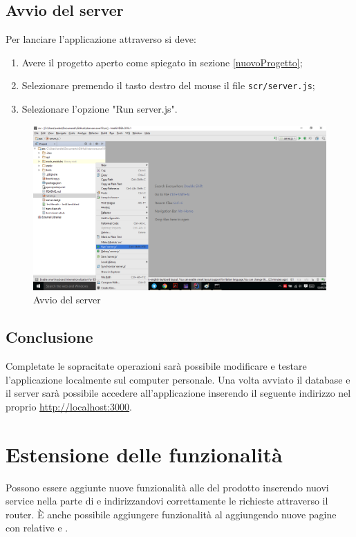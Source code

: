 \documentclass[12pt,a4paper]{article}
\begin{document}
	\subsection{Avvio del server}
	Per lanciare l'applicazione attraverso   si deve:
	\begin{enumerate}
		\item Avere il progetto aperto come spiegato in sezione \ref{nuovoProgetto};
		\item Selezionare premendo il tasto destro del mouse il file \texttt{scr/server.js};
		\item Selezionare l'opzione "Run server.js".
	\end{enumerate}
	\begin{center}
		\begin{figure}[H]
			\centering \includegraphics[max width=\myheight]{../img/manualeSviluppatore/runServer.png}
			\caption{Avvio del server}
		\end{figure}
	\end{center}
		
	\subsection{Conclusione}
	Completate le sopracitate operazioni sarà possibile modificare e testare l'applicazione localmente sul computer personale.
	Una volta avviato il database e il server  sarà possibile accedere all'applicazione inserendo il seguente indirizzo nel proprio  \url{http://localhost:3000}.
	
	\newpage
	\section{Estensione delle funzionalità}
	Possono essere aggiunte nuove funzionalità alle  del prodotto inserendo nuovi service nella parte di  e indirizzandovi correttamente le richieste attraverso il router. È anche possibile aggiungere funzionalità al  aggiungendo nuove pagine con relative  e .
\end{document}
